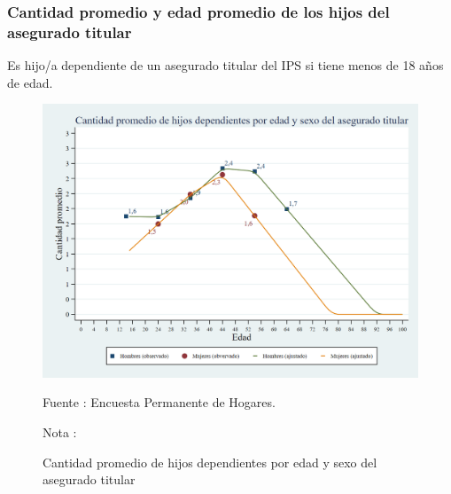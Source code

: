 \subsubsection{Cantidad promedio y edad promedio de los hijos del asegurado titular}

Es hijo/a dependiente de un asegurado titular del IPS si tiene menos de
18 años de edad.

\begin{figure}[H]
\begin{center}
                    \caption{Cantidad promedio de hijos dependientes por edad y sexo del asegurado titular}
                    \includegraphics[scale=0.35]{EPH_familia_nro_prom_hijos.png}
                                    \item \footnotesize Fuente : Encuesta Permanente de Hogares.
                                    \item \footnotesize Nota : 
                    \end{center}
\end{figure}

